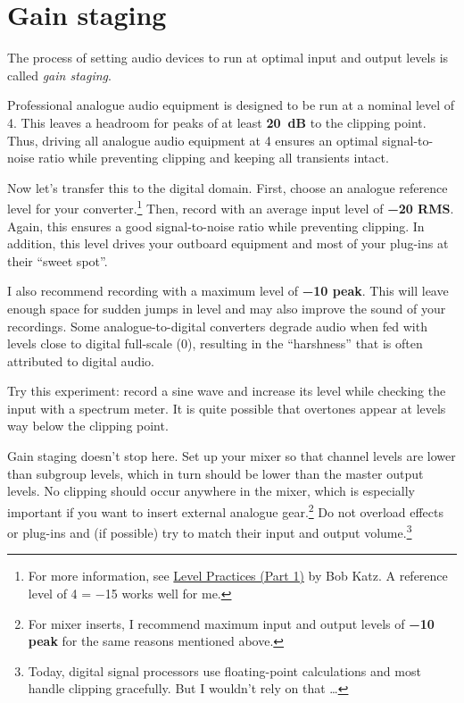 \section{Gain staging}
\label{sec:gain_staging}

The process of setting audio devices to run at optimal input and
output levels is called \emph{gain staging}.

Professional analogue audio equipment is designed to be run at a
nominal level of \SI[retain-explicit-plus]{+4}{\dBu}.  This leaves a
headroom for peaks of at least \textbf{\SI{20}{\dB}} to the clipping
point.  Thus, driving all analogue audio equipment at
\SI[retain-explicit-plus]{+4}{\dBu} ensures an optimal signal-to-noise
ratio while preventing clipping and keeping all transients intact.

Now let's transfer this to the digital domain.  First, choose an
analogue reference level for your converter.\footnote{For more
  information, see
  \href{https://www.digido.com/portfolio-item/level-practices-part-1/}{Level
    Practices (Part 1)} by Bob Katz.  A reference level of
  \SI[retain-explicit-plus]{+4}{\dBu} = \SI{-15}{\dBFS} works well for
  me.}  Then, record with an average input level of
\textbf{\SI{-20}{\dBFS} RMS}.  Again, this ensures a good
signal-to-noise ratio while preventing clipping.  In addition, this
level drives your outboard equipment and most of your plug-ins at
their ``sweet spot''.

I also recommend recording with a maximum level of
\textbf{\SI{-10}{\dBFS} peak}.  This will leave enough space for
sudden jumps in level and may also improve the sound of your
recordings.  Some analogue-to-digital converters degrade audio when
fed with levels close to digital full-scale (\SI{0}{\dBFS}), resulting
in the ``harshness'' that is often attributed to digital audio.

Try this experiment: record a sine wave and increase its level while
checking the input with a spectrum meter.  It is quite possible that
overtones appear at levels way below the clipping point.

Gain staging doesn't stop here.  Set up your mixer so that channel
levels are lower than subgroup levels, which in turn should be lower
than the master output levels.  No clipping should occur anywhere in
the mixer, which is especially important if you want to insert
external analogue gear.\footnote{For mixer inserts, I recommend
  maximum input and output levels of \textbf{\SI{-10}{\dBFS} peak} for
  the same reasons mentioned above.}  Do not overload effects or
plug-ins and (if possible) try to match their input and output
volume.\footnote{Today, digital signal processors use floating-point
  calculations and most handle clipping gracefully.  But I wouldn't
  rely on that \dots}

